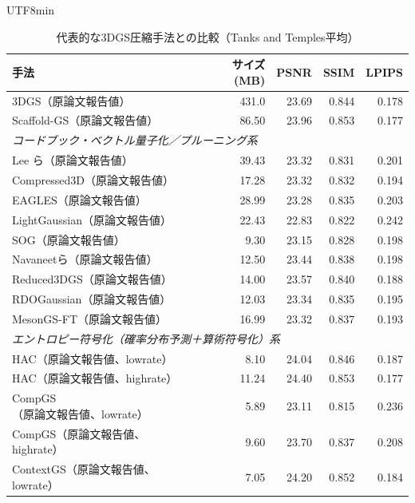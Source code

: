 \documentclass{ieeeaccess}
\begin{document}
\begin{CJK}{UTF8}{min}
\begin{table}[!t]
\renewcommand{\arraystretch}{1.2}
\caption{代表的な3DGS圧縮手法との比較（Tanks and Temples平均）}
\label{tab:literature}
\centering
\begin{tabular}{lrrrr}
\toprule
手法 & サイズ (MB) & PSNR & SSIM & LPIPS \\
\midrule
3DGS\cite{kerbl20233d}（原論文報告値） & 431.0 & 23.69 & 0.844 & 0.178 \\
Scaffold-GS\cite{lu2024scaffold}（原論文報告値） & 86.50 & 23.96 & 0.853 & 0.177 \\
\multicolumn{5}{l}{\textit{コードブック・ベクトル量子化／プルーニング系}} \\
Lee ら\cite{lee2024compact}（原論文報告値） & 39.43 & 23.32 & 0.831 & 0.201 \\
Compressed3D\cite{niedermayr2024compressed}（原論文報告値） & 17.28 & 23.32 & 0.832 & 0.194 \\
EAGLES\cite{girish2024eagles}（原論文報告値） & 28.99 & 23.28 & 0.835 & 0.203 \\
LightGaussian\cite{fan2024lightgaussian}（原論文報告値） & 22.43 & 22.83 & 0.822 & 0.242 \\
SOG\cite{morgenstern2024sog}（原論文報告値） & 9.30 & 23.15 & 0.828 & 0.198 \\
Navaneetら\cite{navaneet2024compact3d}（原論文報告値） & 12.50 & 23.44 & 0.838 & 0.198 \\
Reduced3DGS\cite{papantonakis2024reduced3dgs}（原論文報告値） & 14.00 & 23.57 & 0.840 & 0.188 \\
RDOGaussian\cite{wang2024rdogaussian}（原論文報告値） & 12.03 & 23.34 & 0.835 & 0.195 \\
MesonGS-FT\cite{xie2024mesongs}（原論文報告値） & 16.99 & 23.32 & 0.837 & 0.193 \\
\multicolumn{5}{l}{\textit{エントロピー符号化（確率分布予測＋算術符号化）系}} \\
HAC\cite{chen2024hac}（原論文報告値、lowrate） & 8.10 & 24.04 & 0.846 & 0.187 \\
HAC\cite{chen2024hac}（原論文報告値、highrate） & 11.24 & 24.40 & 0.853 & 0.177 \\
CompGS\cite{liu2024compgs}（原論文報告値、lowrate） & 5.89 & 23.11 & 0.815 & 0.236 \\
CompGS\cite{liu2024compgs}（原論文報告値、highrate） & 9.60 & 23.70 & 0.837 & 0.208 \\
ContextGS\cite{wang2024contextgs}（原論文報告値、lowrate） & 7.05 & 24.20 & 0.852 & 0.184 \\

\end{tabular}
\end{table}
\end{CJK}
\end{document}
